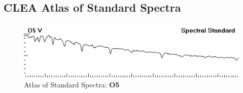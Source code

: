 \documentclass[12pt]{article}
\begin{document}
\newpage

\subsection*{CLEA Atlas of Standard Spectra}

\begin{figure}[H]
    \centering
    \includegraphics[width=.47\textwidth]{O5V.png}
    \caption*{\centering Atlas of Standard Spectra: \textbf{O5}}
\end{figure}
\vspace{-1.5ex}
\end{document}
